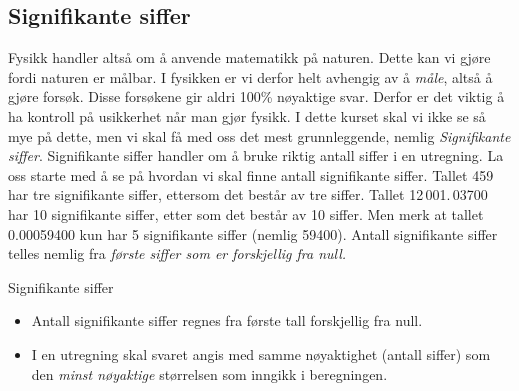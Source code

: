 \subsection{Signifikante siffer}
Fysikk handler altså om å anvende matematikk på naturen. Dette kan vi gjøre fordi naturen er målbar. I fysikken er vi derfor helt avhengig av å \textit{måle}, altså å gjøre forsøk. Disse forsøkene gir aldri 100\% nøyaktige svar. Derfor er det viktig å ha kontroll på usikkerhet når man gjør fysikk. I dette kurset skal vi ikke se så mye på dette, men vi skal få med oss det mest grunnleggende, nemlig \textit{Signifikante siffer}. Signifikante siffer handler om å bruke riktig antall siffer i en utregning. La oss starte med å se på hvordan vi skal finne antall signifikante siffer. Tallet 459 har tre signifikante siffer, ettersom det består av tre siffer. Tallet 12\,001.\,03700 har 10 signifikante siffer, etter som det består av 10 siffer.
Men merk at tallet 0.00059400 kun har 5 signifikante siffer (nemlig 59400). Antall signifikante siffer telles nemlig fra \textit{første siffer som er forskjellig fra null.}

\begin{myoppsum*}{Signifikante siffer}
    \begin{itemize}
        \item Antall signifikante siffer regnes fra første tall forskjellig fra null.
        \item I en utregning skal svaret angis med samme nøyaktighet (antall siffer) som den \textit{minst nøyaktige} størrelsen som inngikk i beregningen.
    \end{itemize}
\end{myoppsum*}


